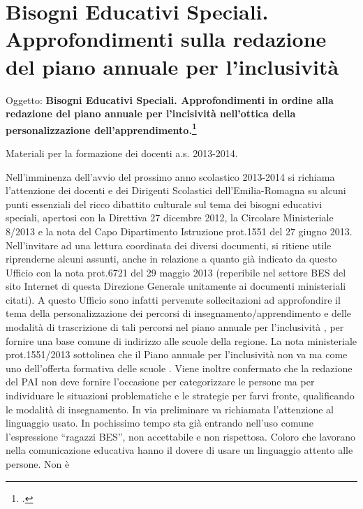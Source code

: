 \chapter{Bisogni Educativi Speciali. Approfondimenti sulla redazione del piano annuale per l'inclusività }

Oggetto: \textbf{ Bisogni Educativi Speciali. Approfondimenti in ordine alla redazione del piano
annuale per l'incisività nell'ottica della personalizzazione dell'apprendimento.\footcite{USRperLEmiliaRomagna2013a}}

Materiali per la formazione dei docenti a.s. 2013-2014.

Nell'imminenza dell'avvio del prossimo anno scolastico 2013-2014 si richiama l'attenzione dei docenti
e dei Dirigenti Scolastici dell'Emilia-Romagna su alcuni punti essenziali del ricco dibattito culturale sul
tema dei bisogni educativi speciali, apertosi con la Direttiva 27 dicembre 2012, la Circolare Ministeriale
8/2013 e la nota del Capo Dipartimento Istruzione prot.1551 del 27 giugno 2013.
Nell'invitare ad una lettura coordinata dei diversi documenti, si ritiene utile riprenderne alcuni assunti,
anche in relazione a quanto già indicato da questo Ufficio con la nota prot.6721 del 29 maggio 2013
(reperibile nel settore BES del sito Internet di questa Direzione Generale unitamente ai documenti
ministeriali citati).
A questo Ufficio sono infatti pervenute sollecitazioni ad approfondire il tema della personalizzazione
dei percorsi di insegnamento/apprendimento e delle modalità di trascrizione di tali percorsi nel piano
annuale per l'inclusività , per fornire una base comune di indirizzo alle scuole della regione.
La nota ministeriale prot.1551/2013 sottolinea che il Piano annuale per l'inclusività non va
 ma come uno
 dell'offerta formativa delle scuole .
Viene inoltre confermato che la redazione del PAI non deve fornire l'occasione per categorizzare le
persone ma per individuare le situazioni problematiche e le strategie per farvi fronte, qualificando le
modalità di insegnamento.
In via preliminare va richiamata l'attenzione al linguaggio usato. In pochissimo tempo sta già entrando
nell'uso comune l'espressione “ragazzi BES”, non accettabile e non rispettosa. Coloro che lavorano
nella comunicazione educativa hanno il dovere di usare un linguaggio attento alle persone. Non è
